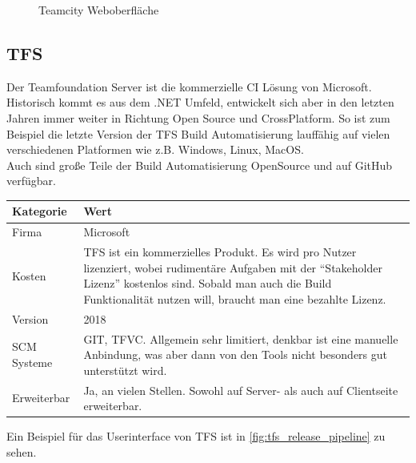 \begin{figure}[H]
  \centering
  \caption{Teamcity Weboberfläche \cite{TeamCity-Marketing}}\label{fig:TC-continuous-integration}
\end{figure}

\subsection{TFS}
Der Teamfoundation Server ist die kommerzielle CI Lösung von Microsoft. Historisch kommt es aus dem .NET Umfeld, entwickelt sich aber in den letzten Jahren immer weiter in Richtung Open Source und CrossPlatform. So ist zum Beispiel die letzte Version der TFS Build Automatisierung lauffähig auf vielen verschiedenen Platformen wie z.B. Windows, Linux, MacOS.\\
Auch sind große Teile der Build Automatisierung OpenSource und auf GitHub verfügbar.
\begin{center}
  \begin{tabularx}{\textwidth}{lX}
    \toprule
    Kategorie & Wert \\
    \midrule
    Firma &  Microsoft \\
		\addlinespace
    Kosten & TFS ist ein kommerzielles Produkt. Es wird pro Nutzer lizenziert, wobei rudimentäre Aufgaben mit der "`Stakeholder Lizenz"' kostenlos sind. Sobald man auch die Build Funktionalität nutzen will, braucht man eine bezahlte Lizenz.\\
		\addlinespace
		Version & 2018 \\
		\addlinespace
		SCM Systeme & GIT, TFVC. Allgemein sehr limitiert, denkbar ist eine manuelle Anbindung, was aber dann von den Tools nicht besonders gut unterstützt wird.\\
		\addlinespace
		Erweiterbar & Ja, an vielen Stellen. Sowohl auf Server- als auch auf Clientseite erweiterbar.\\
    \bottomrule
  \end{tabularx}
\end{center}
Ein Beispiel für das Userinterface von TFS ist in \autoref{fig:tfs_release_pipeline} zu sehen. 

